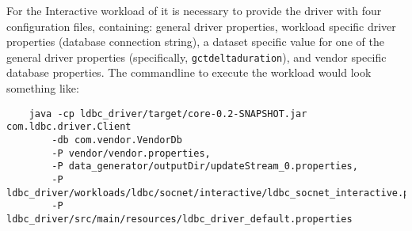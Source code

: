 For the Interactive workload of \ldbcsnb it is necessary to provide the driver with four configuration files, containing:
general driver properties,
workload specific driver properties (\eg database connection string),
a dataset specific value for one of the general driver properties (specifically, \texttt{gctdeltaduration}),
and vendor specific database properties.
The commandline to execute the workload would look something like:

{\footnotesize
	\begin{verbatim}
	java -cp ldbc_driver/target/core-0.2-SNAPSHOT.jar com.ldbc.driver.Client
		-db com.vendor.VendorDb
		-P vendor/vendor.properties,
		-P data_generator/outputDir/updateStream_0.properties,
		-P ldbc_driver/workloads/ldbc/socnet/interactive/ldbc_socnet_interactive.properties
		-P ldbc_driver/src/main/resources/ldbc_driver_default.properties
	\end{verbatim}
}
